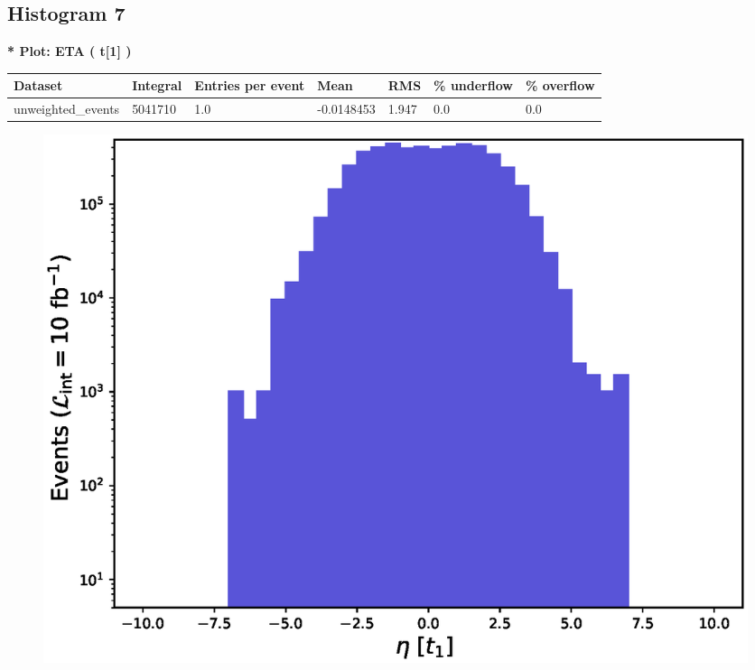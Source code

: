 \documentclass[a4paper, 10pt]{article}
\begin{document}
\subsection{ Histogram 7}

\textbf{* Plot: ETA ( t[1] ) }\\
   \begin{table}[H]
  \begin{center}
    \begin{tabular}{|m{23.0mm}|m{23.0mm}|m{18.0mm}|m{19.0mm}|m{19.0mm}|m{19.0mm}|m{19.0mm}|}
      \hline
      {\cellcolor{yellow}         Dataset}& {\cellcolor{yellow}         Integral}& {\cellcolor{yellow}         Entries per event}& {\cellcolor{yellow}         Mean}& {\cellcolor{yellow}         RMS}& {\cellcolor{yellow}         \% underflow}& {\cellcolor{yellow}         \% overflow}\\
      \hline
      {\cellcolor{white}         unweighted\_events}& {\cellcolor{white}         5041710}& {\cellcolor{white}         1.0}& {\cellcolor{white}         -0.0148453}& {\cellcolor{white}         1.947}& {\cellcolor{green}         0.0}& {\cellcolor{green}         0.0}\\
\hline
    \end{tabular}
  \end{center}
\end{table}

\begin{figure}[H]
  \begin{center}
    \includegraphics[scale=0.45]{selection_6.eps}\\
\caption{   }
  \end{center}
\end{figure}
      \newpage
\end{document}
